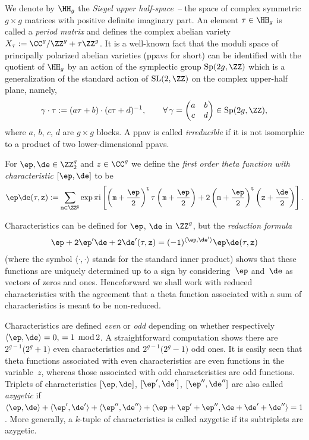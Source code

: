 We denote by $\HH_g$ the {\it Siegel upper half-space}~-- the
space of complex symmetric $g\times g$ matrices with positive definite
imaginary part. An element $\tau\in\HH_g$ is called a {\it period
matrix} and defines the complex abelian variety $X_\tau:=\CC^g/\ZZ^g+\tau
\ZZ^g$. It is a well-known fact that the moduli space of principally polarized abelian varieties (ppavs for short) can be identified with the quotient of $\HH_g$ by an action of the symplectic group ${\rm Sp}(2g, \ZZ)$ which is a generalization of the standard action of ${\rm SL}(2,\ZZ)$ on the complex upper-half plane, namely,
\[
\gamma \cdot \tau := (a \tau + b) \cdot (c \tau + d)^{-1},\qquad \forall\, \gamma = \begin{pmatrix} a & b \\ c & d \end{pmatrix} \in {\rm Sp}(2g,\ZZ),
\]
where $a$, $b$, $c$, $d$ are $g \times g$ blocks. A ppav is called {\it irreducible} if it is not isomorphic to a product of two lower-dimensional ppavs.

For $\ep,\de\in \ZZ_2^g$ and $z\in \CC^g$ we define the {\it first order theta function with characteristic $[\ep,\de]$} to be
\[
\tt\ep\de(\tau,z):=\sum\limits_{m\in\ZZ^g} \exp \pi {\rm i} \left[\left(
m+\frac{\ep}{2}\right)^t\tau \left(m+\frac{\ep}{2}\right)+2\left(m+\frac{\ep}{2}\right)^t\left(z+
\frac{\de}{2}\right)\right].
\]

Characteristics can be defined for $\ep$, $\de$ in $\ZZ^g$, but the {\it reduction formula}
\begin{gather*}%
\tt{\ep+2\ep'}{\de+2\de'} (\tau , z) = (-1)^{\langle \ep ,\de'\rangle} \tt\ep\de(\tau,z) \end{gather*}
(where the symbol $\langle \cdot , \cdot \rangle$ stands for the standard inner product) shows that these functions are uniquely determined up to a sign by considering~$\ep$ and~$\de$ as vectors of zeros and ones. Henceforward we shall work with reduced characteristics with the agreement that a theta function associated with a sum of characteristics is meant to be non-reduced.

Characteristics are defined {\it even} or {\it odd} depending on whether respectively $\langle \ep , \de\rangle =0,\, =1$ ${\rm mod}\, 2$. A straightforward computation shows there are $ 2^{g-1}\big( 2^{g}+1\big)$ even characteristics and $2^{g-1}\big( 2^{g}-1\big)$ odd ones. It is easily seen that theta functions associated with even characteristics are even functions in the variable~$z$, whereas those associated with odd characteristics are odd functions.
Triplets of characteristics $[\ep,\de]$, $[\ep',\de']$, $[\ep'',\de'']$ are also called {\it azygetic} if $\langle \ep , \de\rangle+\langle\ep' , \de'\rangle+\langle\ep'' , \de''\rangle+\langle\ep + \ep' + \ep'' , \de + \de' + \de''\rangle=1$. More generally, a $k$-tuple of characteristics is called azygetic if its subtriplets are azygetic.

